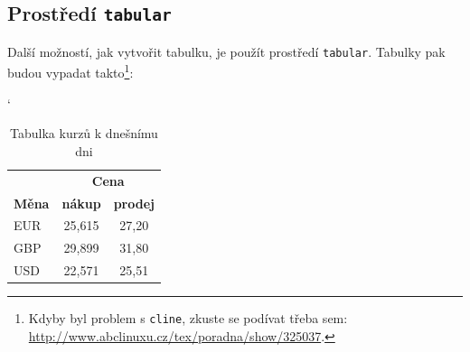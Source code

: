 \documentclass[a4paper, 11pt]{article}
\begin{document}
\subsection{Prostředí \texttt{tabular}}

Další možností, jak vytvořit tabulku, je použít prostředí \texttt{tabular}. Tabulky pak budou vypadat takto\footnote{Kdyby byl problem s \texttt{cline}, zkuste se podívat třeba sem: \href{http://www.abclinuxu.cz/tex/poradna/show/325037}{http://www.abclinuxu.cz/tex/poradna/show/325037}.}:
\bigskip

\begin{table}[ht]
    \centering
    \catcode`
    \begin{tabular}{|l|c|c|}
        \hline
        & \multicolumn{2}{c|}{\textbf{Cena}}  \\ 
        \cline{2-3}
        \textbf{Měna} & \textbf{nákup} & \textbf{prodej}\\ 
        \hline
        EUR & 25,615 & 27,20\\
        GBP & 29,899 & 31,80\\
        USD & 22,571 & 25,51\\
        \hline
    \end{tabular}
    \caption{Tabulka kurzů k dnešnímu dni}
    \label{tab:tab1}
\end{table}

\bigskip
\end{document}
